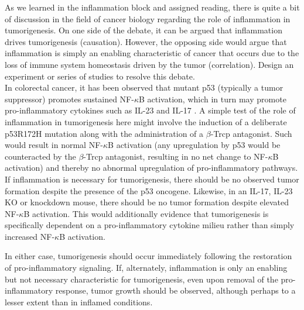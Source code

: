 \documentclass[11pt,letterpaper,final] {article}
\newenvironment{exercise}[2][Exercise]{\begin{trivlist}
	\item[\hskip \labelsep {\bfseries #1}\hskip \labelsep {\bfseries #2.}]}{\end{trivlist}}
\begin{document}
\begin{exercise}[Exercise]{3} As we learned in the inflammation block and assigned reading, there is quite a bit of discussion in the field of cancer biology regarding the role of inflammation in tumorigenesis. On one side of the debate, it can be argued that inflammation drives tumorigenesis (causation). However, the opposing side would argue that inflammation is simply an enabling characteristic of cancer that occurs due to the loss of immune system homeostasis driven by the tumor (correlation). Design an experiment or series of studies to resolve this debate.\\

In colorectal cancer, it has been observed that mutant p53 (typically a tumor suppressor) promotes sustained NF-$\kappa$B activation, which in turn may promote pro-inflammatory cytokines such as IL-23 and IL-17 \cite{Dibra:2014}. A simple test of the role of inflammation in tumorigenesis here might involve the induction of a deliberate p53R172H mutation along with the administration of a $\beta$-Trcp antagonist. Such would result in normal NF-$\kappa$B activation (any upregulation by p53 would be counteracted by the $\beta$-Trcp antagonist, resulting in no net change to NF-$\kappa$B activation) and thereby no abnormal upregulation of pro-inflammatory pathways. If inflammation is necessary for tumorigenesis, there should be no observed tumor formation despite the presence of the p53 oncogene. Likewise, in an IL-17, IL-23 KO or knockdown mouse, there should be no tumor formation despite elevated NF-$\kappa$B activation. This would additionally evidence that tumorigenesis is specifically dependent on a pro-inflammatory cytokine milieu rather than simply increased NF-$\kappa$B activation.

In either case, tumorigenesis should occur immediately following the restoration of pro-inflammatory signaling. If, alternately, inflammation is only an enabling but not necessary characteristic for tumorigenesis, even upon removal of the pro-inflammatory response, tumor growth should be observed, although perhaps to a lesser extent than in inflamed conditions.

\end{exercise}
\end{document}
